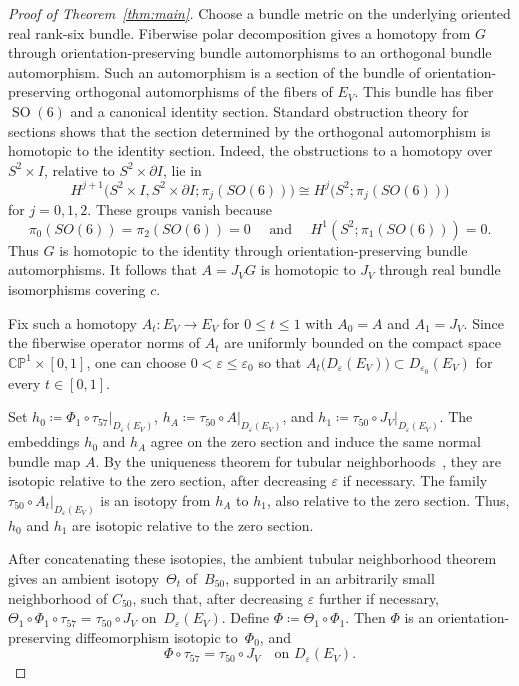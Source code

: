 \documentclass[10pt,a4paper]{amsart}
\numberwithin{equation}{section}
\newcommand{\CP}{\mathbb{CP}}
\newcommand{\wideand}{ \quad \text{ and } \quad }
\DeclareMathOperator{\SO}{SO}
\begin{document}
\begin{proof}[Proof of Theorem~\ref{thm:main}]
    Choose a bundle metric on the underlying oriented real rank-six bundle.
    Fiberwise polar decomposition gives a homotopy from $G$ through orientation-preserving bundle automorphisms to an orthogonal bundle automorphism. 
    Such an automorphism is a section of the bundle of orientation-preserving orthogonal automorphisms of the fibers of $E_V$. 
    This bundle has fiber~$\SO(6)$ and a canonical identity section.
    Standard obstruction theory for sections \cite[Part~III]{Steenrod1999book} shows that the section determined by the orthogonal automorphism is homotopic to the identity section. 
    Indeed, the obstructions to a homotopy over~$S^2\times I$, relative to $S^2\times\partial I$, lie in
    $$
        H^{j+1}\bigl(S^2\times I,S^2\times\partial I;\pi_j(SO(6))\bigr)\cong H^j\bigl(S^2;\pi_j(SO(6))\bigr)
    $$
    for $j=0,1,2$. 
    These groups vanish because
    $$
    \pi_0(SO(6))=\pi_2(SO(6))=0 \wideand H^1(S^2;\pi_1(SO(6)))=0.
    $$
    Thus $G$ is homotopic to the identity through orientation-preserving bundle automorphisms.
    It follows that $A=J_VG$ is homotopic to $J_V$ through real bundle isomorphisms covering $c$.

    Fix such a homotopy $A_t\colon E_V\to E_V$ for $0\leq t\leq 1$ with $A_0=A$ and $A_1=J_V$.
    Since the fiberwise operator norms of $A_t$ are uniformly bounded on the compact space $\CP^1\times[0,1]$, one can choose $0<\varepsilon\leq\varepsilon_0$ so that $A_t\bigl(D_\varepsilon(E_V)\bigr) \subset D_{\varepsilon_0}(E_V)$ for every $t\in[0,1]$.
    
    Set $h_0 \coloneq  \left.\Phi_1\circ\tau_{57}\right|_{D_\varepsilon(E_V)}$, $h_A \coloneq\left.\tau_{50}\circ A\right|_{D_\varepsilon(E_V)}$, and $h_1 \coloneq\left.\tau_{50}\circ J_V\right|_{D_\varepsilon(E_V)}$.
    The embeddings $h_0$ and $h_A$ agree on the zero section and induce the same normal bundle map $A$. 
    By the uniqueness theorem for tubular neighborhoods~\cite[Chapter~4, Theorem~5.3]{Hirsch1976book}, they are isotopic relative to the zero section, after decreasing $\varepsilon$ if necessary.
    The family $\tau_{50}\circ A_t|_{D_\varepsilon(E_V)}$ is an isotopy from $h_A$ to $h_1$, also relative to the zero section.
    Thus,$h_0$ and $h_1$ are isotopic relative to the zero section.

    After concatenating these isotopies, the ambient tubular neighborhood theorem~\cite[Chapter~8, Theorem~1.8]{Hirsch1976book} gives an ambient isotopy~$\Theta_t$ of~$B_{50}$, supported in an arbitrarily small neighborhood of $C_{50}$, such that, after decreasing $\varepsilon$ further if necessary, $\Theta_1\circ\Phi_1\circ\tau_{57}=\tau_{50}\circ J_V$ on~$D_\varepsilon(E_V)$.
    Define $\Phi \coloneq \Theta_1\circ\Phi_1$.
    Then $\Phi$ is an orientation-preserving diffeomorphism isotopic to~$\Phi_0$, and
    \begin{equation}\label{eq:J_V}
        \Phi\circ\tau_{57} =\tau_{50}\circ J_V \quad\text{on }D_\varepsilon(E_V).
    \end{equation}


\end{proof}
\end{document}
